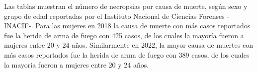 \justifying Las tablas muestran el número de necropsias por causa de muerte, según sexo y grupo de edad reportadas por el Instituto Nacional de Ciencias Forenses -INACIF-. Para las mujeres en 2018 la causa de muerte con más casos reportados fue la herida de arma de fuego con 425 casos, de los cuales la mayoría fueron a mujeres entre 20 y 24 años. Similarmente en 2022, la mayor causa de muertes con más casos reportados fue la herida de arma de fuego con 389 casos, de los cuales la mayoría fueron a mujeres entre 20 y 24 años.